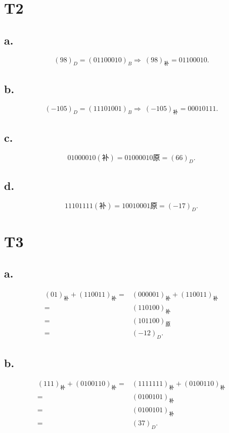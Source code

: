 \documentclass{article}
\begin{document}
\section*{T2}
    \subsection*{a.}
        \[
            {(98)}_D={(01100010)}_B
            \Rightarrow\ 
            {(98)}_{\mbox{补}}=01100010.
        \]    
    \subsection*{b.}
        \[
            {(-105)}_D={(11101001)}_B
            \Rightarrow\ 
            {(-105)}_{\mbox{补}}=00010111.
        \]
    \subsection*{c.}
        \[
            01000010(\mbox{补})=01000010\mbox{原}={(66)}_D.
        \]
    \subsection*{d.}
        \[
            11101111(\mbox{补})=10010001\mbox{原}={(-17)}_D.  
        \]
\section*{T3}
    \subsection*{a.}
        \begin{align*}
            {(01)}_{\mbox{补}}+{(110011)}_{\mbox{补}}
            =&{(000001)}_{\mbox{补}}+{(110011)}_{\mbox{补}}\\
            =&{(110100)}_{\mbox{补}}\\
            =&{(101100)}_{\mbox{原}}\\
            =&{(-12)}_D.
        \end{align*}
    \subsection*{b.}
        \begin{align*}
            {(111)}_{\mbox{补}}+{(0100110)}_{\mbox{补}}
            =&{(1111111)}_{\mbox{补}}+{(0100110)}_{\mbox{补}}\\
            =&{(0100101)}_{\mbox{补}}\\
            =&{(0100101)}_{\mbox{补}}\\
            =&{(37)}_D.
        \end{align*}
\end{document}

